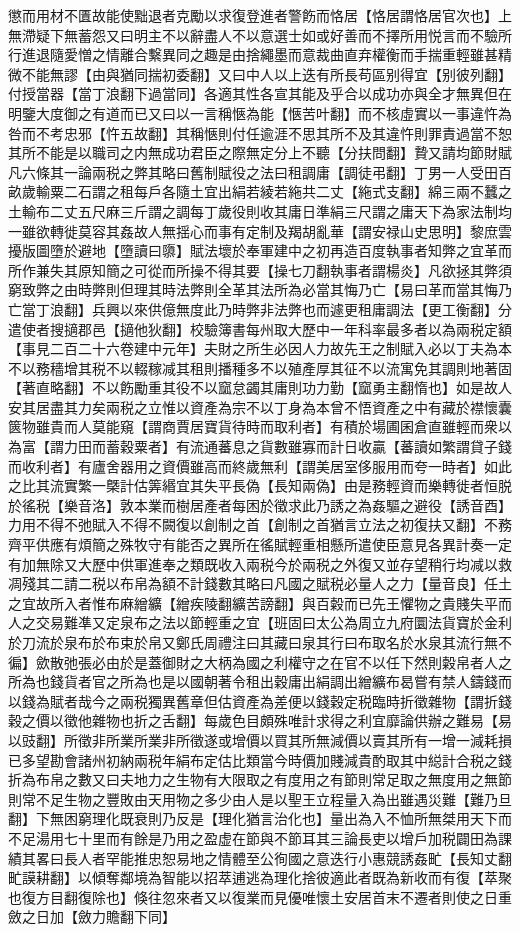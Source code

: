 懲而用材不匱故能使黜退者克勵以求復登進者警飭而恪居【恪居謂恪居官次也】上無滯疑下無蓄怨又曰明主不以辭盡人不以意選士如或好善而不擇所用悦言而不驗所行進退隨愛憎之情離合繫異同之趣是由捨繩墨而意裁曲直弃權衡而手揣重輕雖甚精微不能無謬【由與猶同揣初委翻】又曰中人以上迭有所長苟區别得宜【别彼列翻】付授當器【當丁浪翻下過當同】各適其性各宣其能及乎合以成功亦與全才無異但在明鑒大度御之有道而已又曰以一言稱愜為能【愜苦叶翻】而不核虛實以一事違忤為咎而不考忠邪【忤五故翻】其稱愜則付任逾涯不思其所不及其違忤則罪責過當不恕其所不能是以職司之内無成功君臣之際無定分上不聽【分扶問翻】贄又請均節財賦凡六條其一論兩税之弊其略曰舊制賦役之法曰租調庸【調徒弔翻】丁男一人受田百畝歲輸粟二石謂之租每戶各隨土宜出絹若綾若絁共二丈【絁式支翻】綿三兩不蠶之土輸布二丈五尺麻三斤謂之調每丁歲役則收其庸日準絹三尺謂之庸天下為家法制均一雖欲轉徙莫容其姦故人無揺心而事有定制及羯胡亂華【謂安禄山史思明】黎庶雲擾版圖墮於避地【墮讀曰隳】賦法壞於奉軍建中之初再造百度執事者知弊之宜革而所作兼失其原知簡之可從而所操不得其要【操七刀翻執事者謂楊炎】凡欲拯其弊須窮致弊之由時弊則但理其時法弊則全革其法所為必當其悔乃亡【易曰革而當其悔乃亡當丁浪翻】兵興以來供億無度此乃時弊非法弊也而遽更租庸調法【更工衡翻】分遣使者搜擿郡邑【擿他狄翻】校驗簿書每州取大歷中一年科率最多者以為兩税定額【事見二百二十六卷建中元年】夫財之所生必因人力故先王之制賦入必以丁夫為本不以務穡增其税不以輟稼减其租則播種多不以殖產厚其征不以流寓免其調則地著固【著直略翻】不以飭勵重其役不以窳怠蠲其庸則功力勤【窳勇主翻惰也】如是故人安其居盡其力矣兩税之立惟以資產為宗不以丁身為本曾不悟資產之中有藏於襟懷囊篋物雖貴而人莫能窺【謂商賈居寶貨待時而取利者】有積於場圃囷倉直雖輕而衆以為富【謂力田而蓄穀粟者】有流通蕃息之貨數雖寡而計日收贏【蕃讀如繁謂貸子錢而收利者】有廬舍器用之資價雖高而終歲無利【謂美居室侈服用而夸一時者】如此之比其流實繁一槩計估筭緡宜其失平長偽【長知兩偽】由是務輕資而樂轉徙者恒脱於徭税【樂音洛】敦本業而樹居產者每困於徵求此乃誘之為姦驅之避役【誘音酉】力用不得不弛賦入不得不闕復以創制之首【創制之首猶言立法之初復扶又翻】不務齊平供應有煩簡之殊牧守有能否之異所在徭賦輕重相懸所遣使臣意見各異計奏一定有加無除又大歷中供軍進奉之類既收入兩税今於兩税之外復又並存望稍行均减以救凋殘其二請二税以布帛為額不計錢數其略曰凡國之賦税必量人之力【量音良】任土之宜故所入者惟布麻繒纊【繒疾陵翻纊苦謗翻】與百糓而已先王懼物之貴賤失平而人之交易難凖又定泉布之法以節輕重之宜【班固曰太公為周立九府圜法貨寶於金利於刀流於泉布於布束於帛又鄭氏周禮注曰其藏曰泉其行曰布取名於水泉其流行無不徧】歛散弛張必由於是蓋御財之大柄為國之利權守之在官不以任下然則糓帛者人之所為也錢貨者官之所為也是以國朝著令租出穀庸出絹調出繒纊布曷嘗有禁人鑄錢而以錢為賦者哉今之兩税獨異舊章但估資產為差便以錢穀定税臨時折徵雜物【謂折錢穀之價以徵他雜物也折之舌翻】每歲色目頗殊唯計求得之利宜靡論供辦之難易【易以豉翻】所徵非所業所業非所徵遂或增價以買其所無減價以賣其所有一增一減耗損已多望勘會諸州初納兩税年絹布定估比類當今時價加賤減貴酌取其中縂計合税之錢折為布帛之數又曰夫地力之生物有大限取之有度用之有節則常足取之無度用之無節則常不足生物之豐敗由天用物之多少由人是以聖王立程量入為出雖遇災難【難乃旦翻】下無困窮理化既衰則乃反是【理化猶言治化也】量出為入不恤所無桀用天下而不足湯用七十里而有餘是乃用之盈虚在節與不節耳其三論長吏以增戶加税闢田為課績其畧曰長人者罕能推忠恕易地之情體至公徇國之意迭行小惠競誘姦甿【長知丈翻甿謨耕翻】以傾奪鄰境為智能以招萃逋逃為理化捨彼適此者既為新收而有復【萃聚也復方目翻復除也】倏往忽來者又以復業而見優唯懷土安居首末不遷者則使之日重斂之日加【斂力贍翻下同】